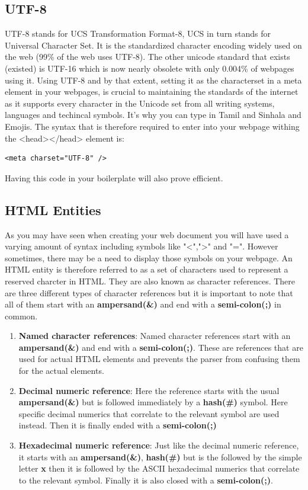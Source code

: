 \documentclass[11pt]{article}
\begin{document}
\subsection{UTF-8}
\label{sec:org096ef2a}
UTF-8 stands for UCS Transformation Format-8, UCS in turn stands for Universal Character Set. It is
the standardized character encoding widely used on the web (99\% of the web uses UTF-8). The other
unicode standard that exists (existed) is UTF-16 which is now nearly obsolete with only 0.004\% of
webpages using it.
Using UTF-8 and by that extent, setting it as the characterset in a meta element in your webpages,
is crucial to maintaining the standards of the internet as it supports every character in the
Unicode set from all writing systems, languages and techincal symbols. It's why you can type in
Tamil and Sinhala and Emojis.
The syntax that is therefore required to enter into your webpage withing the <head></head> element
is:
\begin{verbatim}
<meta charset="UTF-8" />
\end{verbatim}
Having this code in your boilerplate will also prove efficient.
\subsection{HTML Entities}
\label{sec:orgb47616e}
As you may have seen when creating your web document you will have used a varying amount of syntax
including symbols like "<",">" and "=". However sometimes, there may be a need to display those
symbols on your webpage. An HTML entity is therefore referred to as a set of characters used to
represent a reserved charcter in HTML. They are also known as character references.
There are three different types of character references but it is important to note that all of them
start with an \textbf{ampersand(\&)} and end with a \textbf{semi-colon(;)} in common.
\begin{enumerate}
\item \textbf{Named character references}: Named character references start with an \textbf{ampersand(\&)} and end with a
\textbf{semi-colon(;)}. These are references that are used for actual HTML elements and prevents the
parser from confusing them for the actual elements.
\item \textbf{Decimal numeric reference}: Here the reference starts with the usual \textbf{ampersand(\&)} but is followed
immediately by a \textbf{hash(\#)} symbol. Here specific decimal numerics that correlate to the relevant
symbol are used instead. Then it is finally ended with a \textbf{semi-colon(;)}
\item \textbf{Hexadecimal numeric reference}: Just like the decimal numeric reference, it starts with an
\textbf{ampersand(\&)}, \textbf{hash(\#)} but is the followed by the simple letter \textbf{x} then it is followed by the ASCII
hexadecimal numerics that correlate to the relevant symbol. Finally it is also closed with a
\textbf{semi-colon(;)}.
\end{enumerate}
\end{document}
